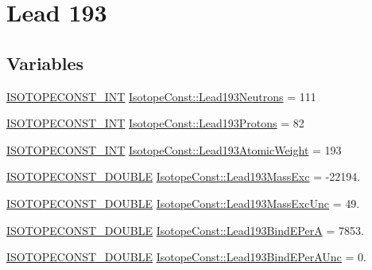 \hypertarget{group___isotope_const-_lead-_pb193}{}\section{Lead 193}
\label{group___isotope_const-_lead-_pb193}
\subsection*{Variables}
\begin{DoxyCompactItemize}
\item 
\mbox{\hyperlink{group___isotope_const-_macros_ga5f18360b3e99483a35c32d789e62621c}{I\+S\+O\+T\+O\+P\+E\+C\+O\+N\+S\+T\+\_\+\+I\+NT}} \mbox{\hyperlink{group___isotope_const-_lead-_pb193_ga6f88824c8d429fe797a0c7bc6c2240b3}{Isotope\+Const\+::\+Lead193\+Neutrons}} = 111
\item 
\mbox{\hyperlink{group___isotope_const-_macros_ga5f18360b3e99483a35c32d789e62621c}{I\+S\+O\+T\+O\+P\+E\+C\+O\+N\+S\+T\+\_\+\+I\+NT}} \mbox{\hyperlink{group___isotope_const-_lead-_pb193_gaf5279a577ff3cca1d0e2314e48339586}{Isotope\+Const\+::\+Lead193\+Protons}} = 82
\item 
\mbox{\hyperlink{group___isotope_const-_macros_ga5f18360b3e99483a35c32d789e62621c}{I\+S\+O\+T\+O\+P\+E\+C\+O\+N\+S\+T\+\_\+\+I\+NT}} \mbox{\hyperlink{group___isotope_const-_lead-_pb193_ga22546bd9dbbe97f39fd59200c09b936d}{Isotope\+Const\+::\+Lead193\+Atomic\+Weight}} = 193
\item 
\mbox{\hyperlink{group___isotope_const-_macros_ga8f45a7272ce02c0b4c65c44636ed719a}{I\+S\+O\+T\+O\+P\+E\+C\+O\+N\+S\+T\+\_\+\+D\+O\+U\+B\+LE}} \mbox{\hyperlink{group___isotope_const-_lead-_pb193_gaea2bb12a87afc2886fcc97dc46c34b65}{Isotope\+Const\+::\+Lead193\+Mass\+Exc}} = -\/22194.
\item 
\mbox{\hyperlink{group___isotope_const-_macros_ga8f45a7272ce02c0b4c65c44636ed719a}{I\+S\+O\+T\+O\+P\+E\+C\+O\+N\+S\+T\+\_\+\+D\+O\+U\+B\+LE}} \mbox{\hyperlink{group___isotope_const-_lead-_pb193_gae9a85489cba65c84c9ab89645d8e5351}{Isotope\+Const\+::\+Lead193\+Mass\+Exc\+Unc}} = 49.
\item 
\mbox{\hyperlink{group___isotope_const-_macros_ga8f45a7272ce02c0b4c65c44636ed719a}{I\+S\+O\+T\+O\+P\+E\+C\+O\+N\+S\+T\+\_\+\+D\+O\+U\+B\+LE}} \mbox{\hyperlink{group___isotope_const-_lead-_pb193_gaa4a8960313495dbea424f377be7fe46d}{Isotope\+Const\+::\+Lead193\+Bind\+E\+PerA}} = 7853.
\item 
\mbox{\hyperlink{group___isotope_const-_macros_ga8f45a7272ce02c0b4c65c44636ed719a}{I\+S\+O\+T\+O\+P\+E\+C\+O\+N\+S\+T\+\_\+\+D\+O\+U\+B\+LE}} \mbox{\hyperlink{group___isotope_const-_lead-_pb193_gac4743055586af3b07c5c160fa5af31c9}{Isotope\+Const\+::\+Lead193\+Bind\+E\+Per\+A\+Unc}} = 0.

\end{DoxyCompactItemize}
